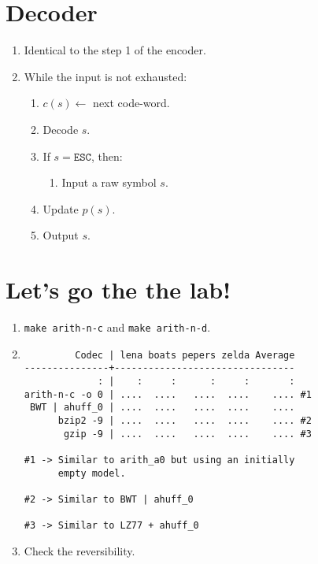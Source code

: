 \section{Decoder}
\begin{enumerate}
\item Identical to the step 1 of the encoder.
\item While the input is not exhausted:
  \begin{enumerate}
  \item $c(s)\leftarrow $ next code-word.
  \item Decode $s$.
  \item If $s=\mathtt{ESC}$, then:
    \begin{enumerate}
    \item Input a raw symbol $s$.
    \end{enumerate}
  \item Update $p(s)$.
  \item Output $s$.
  \end{enumerate}
\end{enumerate}

\section*{Let's go the the lab!}
\begin{enumerate}
\item \texttt{make arith-n-c} and \texttt{make arith-n-d}.
\item
\begin{verbatim}
         Codec | lena boats pepers zelda Average
---------------+--------------------------------
             : |    :     :      :     :       :
arith-n-c -o 0 | ....  ....   ....  ....    .... #1
 BWT | ahuff_0 | ....  ....   ....  ....    ....
      bzip2 -9 | ....  ....   ....  ....    .... #2
       gzip -9 | ....  ....   ....  ....    .... #3

#1 -> Similar to arith_a0 but using an initially
      empty model.

#2 -> Similar to BWT | ahuff_0

#3 -> Similar to LZ77 + ahuff_0
\end{verbatim}
\item Check the reversibility.
\end{enumerate}


